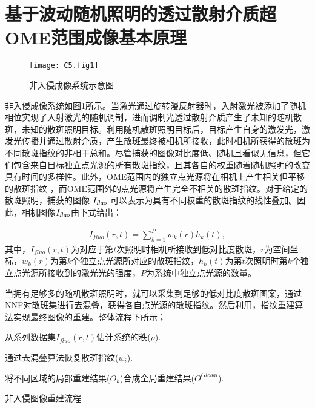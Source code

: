 \section{基于波动随机照明的透过散射介质超OME范围成像基本原理}

\begin{figure}[htp]
	\centering
	\texttt{[image: C5.fig1]}
	\caption{非入侵成像系统示意图}
	\label{fig:5.1}
\end{figure}

非入侵成像系统如图\ref{fig:5.1}所示。当激光通过旋转漫反射器时，入射激光被添加了随机相位实现了入射激光的随机调制，进而调制光透过散射介质产生了未知的随机散斑，未知的散斑照明目标。利用随机散斑照明目标后，目标产生自身的激发光，激发光传播并通过散射介质，产生散斑最终被相机所接收，此时相机所获得的散斑为不同散斑指纹的非相干总和。尽管捕获的图像对比度低、随机且看似无信息，但它们包含来自目标独立点光源的所有散斑指纹，且其各自的权重随着随机照明的改变具有时间的多样性。此外，OME范围内的独立点光源将在相机上产生相关但平移的散斑指纹 \cite{Freund1988}，而OME范围外的点光源将产生完全不相关的散斑指纹。对于给定的散斑照明，捕获的图像 $I_{\textsl{fluo}}$ 可以表示为具有不同权重的散斑指纹的线性叠加。因此，相机图像$I_{\textsl{fluo}}$由下式给出：

\begin{equation}
\begin{aligned}
I_{fluo}(r,t) = \sum^{P}_{k=1} w_{k}(r) h_{k}(t),
\label{eq:5.1}
\end{aligned}
\end{equation}
其中，$I_{fluo}(r,t)$为对应于第$t$次照明时相机所接收到低对比度散斑，$r$为空间坐标，$w_{k}(r)$为第$k$个独立点光源所对应的散斑指纹，$h_{k}(t)$为第$t$次照明时第$k$个独立点光源所接收到的激光光的强度，$P$为系统中独立点光源的数量。

当拥有足够多的随机散斑照明时，就可以采集到足够的低对比度散斑图案，通过NNF对散斑集进行去混叠，获得各自点光源的散斑指纹。然后利用，指纹重建算法实现最终图像的重建。整体流程下所示；
\begin{algorithm2e}[h!]
\DontPrintSemicolon
\SetAlgoLined
{}
从系列数据集$I_{fluo}(r,t)$估计系统的秩($\rho$).\;

通过去混叠算法恢复散斑指纹($w_{i}$).\;


将不同区域的局部重建结果($O_{k}$)合成全局重建结果($O^{Global}$).\;

\caption{非入侵图像重建流程}
\label{alg:a1}
\end{algorithm2e}

